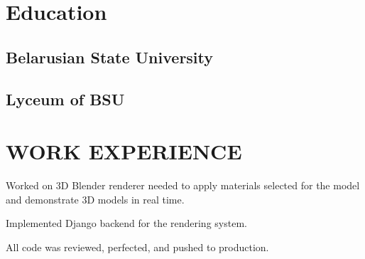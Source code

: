 \documentclass[]{deedy-resume-openfont}
\begin{document}


\begin{minipage}[t]{0.40\textwidth}

\section{Education} 
\large
\subsection{Belarusian State University}
\sectionsep
\sectionsep

\subsection{Lyceum of BSU}



\end{minipage} 
\hfill
\begin{minipage}[t]{0.59\textwidth} 


\section{WORK EXPERIENCE}


\vspace{\topsep} %
\begin{tightemize}
\large
\item Worked on 3D Blender renderer needed to apply materials selected for the model and demonstrate 3D models in real time.
\item Implemented Django backend for the rendering system.
\item All code was reviewed, perfected, and pushed to production.
\end{tightemize}
\sectionsep


\end{minipage} 

\vspace{\topsep}
\end{document}
